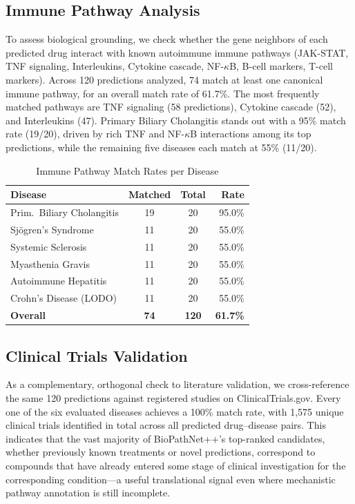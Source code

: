 \documentclass[conference]{IEEEtran}
\begin{document}
\subsection{Immune Pathway Analysis}

To assess biological grounding, we check whether the gene neighbors of each predicted drug interact with known autoimmune immune pathways (JAK-STAT, TNF signaling, Interleukins, Cytokine cascade, NF-$\kappa$B, B-cell markers, T-cell markers). Across 120 predictions analyzed, 74 match at least one canonical immune pathway, for an overall match rate of 61.7\%. The most frequently matched pathways are TNF signaling (58 predictions), Cytokine cascade (52), and Interleukins (47). Primary Biliary Cholangitis stands out with a 95\% match rate (19/20), driven by rich TNF and NF-$\kappa$B interactions among its top predictions, while the remaining five diseases each match at 55\% (11/20).

\begin{table}[!t]
\caption{Immune Pathway Match Rates per Disease}
\label{tab:pathway}
\centering
\footnotesize
\renewcommand{\arraystretch}{1.4}
\begin{tabular}{p{2.8cm}ccr}
\toprule
\textbf{Disease} & \textbf{Matched} & \textbf{Total} & \textbf{Rate} \\
\midrule
Prim.\ Biliary Cholangitis & 19 & 20 & 95.0\% \\
Sj\"{o}gren's Syndrome & 11 & 20 & 55.0\% \\
Systemic Sclerosis & 11 & 20 & 55.0\% \\
Myasthenia Gravis & 11 & 20 & 55.0\% \\
Autoimmune Hepatitis & 11 & 20 & 55.0\% \\
Crohn's Disease (LODO) & 11 & 20 & 55.0\% \\
\midrule
\textbf{Overall} & \textbf{74} & \textbf{120} & \textbf{61.7\%} \\
\bottomrule
\end{tabular}
\end{table}

\subsection{Clinical Trials Validation}

As a complementary, orthogonal check to literature validation, we cross-reference the same 120 predictions against registered studies on ClinicalTrials.gov. Every one of the six evaluated diseases achieves a 100\% match rate, with 1,575 unique clinical trials identified in total across all predicted drug--disease pairs. This indicates that the vast majority of BioPathNet++'s top-ranked candidates, whether previously known treatments or novel predictions, correspond to compounds that have already entered some stage of clinical investigation for the corresponding condition---a useful translational signal even where mechanistic pathway annotation is still incomplete.
\end{document}
